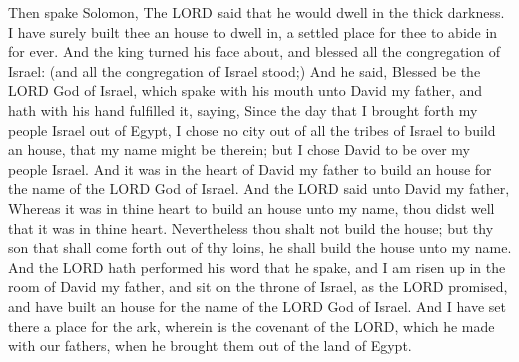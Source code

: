  Then spake Solomon, The LORD said that he would dwell in
the thick darkness.  I have surely built thee an house to
dwell in, a settled place for thee to abide in for ever. 
And the king turned his face about, and blessed all the congregation of
Israel: (and all the congregation of Israel stood;)  And
he said, Blessed be the LORD God of Israel, which spake with his mouth
unto David my father, and hath with his hand fulfilled it, saying,
 Since the day that I brought forth my people Israel out
of Egypt, I chose no city out of all the tribes of Israel to build an
house, that my name might be therein; but I chose David to be over my
people Israel.  And it was in the heart of David my
father to build an house for the name of the LORD God of Israel.
 And the LORD said unto David my father, Whereas it was
in thine heart to build an house unto my name, thou didst well that it
was in thine heart.  Nevertheless thou shalt not build
the house; but thy son that shall come forth out of thy loins, he shall
build the house unto my name.  And the LORD hath
performed his word that he spake, and I am risen up in the room of David
my father, and sit on the throne of Israel, as the LORD promised, and
have built an house for the name of the LORD God of Israel.
 And I have set there a place for the ark, wherein is the
covenant of the LORD, which he made with our fathers, when he brought
them out of the land of Egypt.

